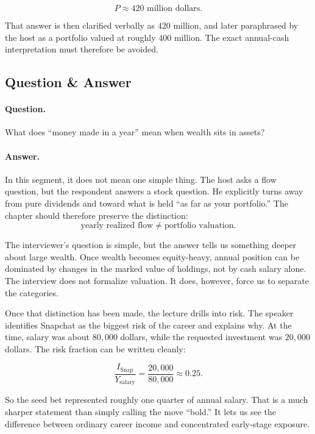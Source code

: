 \begin{equation}
P \approx 420 \text{ million dollars}.
\end{equation}

That answer is then clarified verbally as \(420\) million, and later paraphrased by the host as a portfolio valued at roughly \(400\) million. The exact annual-cash interpretation must therefore be avoided.

\subsection{Question \& Answer}

\paragraph{Question.} What does ``money made in a year'' mean when wealth sits in assets?

\paragraph{Answer.} In this segment, it does not mean one simple thing. The host asks a flow question, but the respondent answers a stock question. He explicitly turns away from pure dividends and toward what is held ``as far as your portfolio.'' The chapter should therefore preserve the distinction:
\[
\text{yearly realized flow} \neq \text{portfolio valuation}.
\]

The interviewer's question is simple, but the answer tells us something deeper about large wealth. Once wealth becomes equity-heavy, annual position can be dominated by changes in the marked value of holdings, not by cash salary alone. The interview does not formalize valuation. It does, however, force us to separate the categories.

Once that distinction has been made, the lecture drills into risk. The speaker identifies Snapchat as the biggest risk of the career and explains why. At the time, salary was about \(80{,}000\) dollars, while the requested investment was \(20{,}000\) dollars. The risk fraction can be written cleanly:

\begin{equation}
\frac{I_{\mathrm{Snap}}}{Y_{\mathrm{salary}}}
=
\frac{20{,}000}{80{,}000}
\approx 0.25.
\end{equation}

So the seed bet represented roughly one quarter of annual salary. That is a much sharper statement than simply calling the move ``bold.'' It lets us see the difference between ordinary career income and concentrated early-stage exposure.

